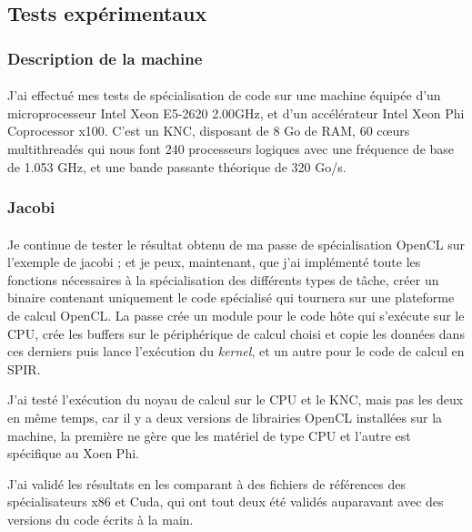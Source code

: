 \subsection{Tests expérimentaux}
\subsubsection{Description de la machine}
\paragraph{}
J'ai effectué mes tests de spécialisation de code sur une machine équipée d'un
microprocesseur Intel Xeon E5-2620 2.00GHz, et d'un accélérateur Intel Xeon Phi
Coprocessor x100. C'est un KNC, disposant de 8 Go de RAM, 60 c\oe{}urs
multithreadés qui nous font 240 processeurs logiques avec une fréquence de base
de 1.053 GHz, et une bande passante théorique de 320 Go/s.

\subsubsection{Jacobi}
\paragraph{}
Je continue de tester le résultat obtenu de ma passe de spécialisation OpenCL
sur l'exemple de jacobi ; et je peux, maintenant, que j'ai implémenté toute les
fonctions nécessaires à la spécialisation des différents types de tâche, créer un
binaire contenant uniquement le code spécialisé qui tournera sur une plateforme
de calcul OpenCL. La passe crée un module pour le code hôte qui s'exécute sur le
CPU, crée les buffers sur le périphérique de calcul choisi et copie les
données dans ces derniers puis lance l'exécution du \emph{kernel}, et un autre
pour le code de calcul en SPIR.

J'ai testé l'exécution du noyau de calcul sur le CPU et le KNC, mais pas les
deux en même temps, car il y a deux versions de librairies OpenCL installées sur
la machine, la première ne gère que les matériel de type CPU et l'autre est
spécifique au Xoen Phi.

J'ai validé les résultats en les comparant à des fichiers de références des
spécialisateurs x86 et Cuda, qui ont tout deux été validés auparavant avec des
versions du code écrits à la main.

